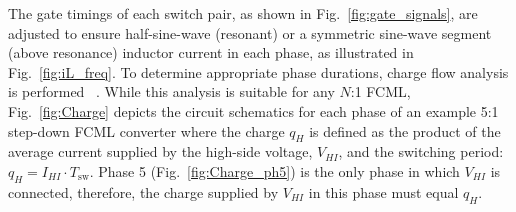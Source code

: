 








The gate timings of each switch pair, as shown in Fig.~\ref{fig:gate_signals}, are adjusted to ensure half-sine-wave (resonant) or a symmetric sine-wave segment (above resonance) inductor current in each phase, as illustrated in Fig.~\ref{fig:iL_freq}.
To determine appropriate phase durations, charge flow analysis is performed ~\cite{Seeman2008}.
While this analysis is suitable for any $N$:1 FCML, Fig.~\ref{fig:Charge} depicts the circuit schematics for each phase of an example 5:1 step-down FCML converter where the charge $q_{H}$ is defined as the product of the average current supplied by the high-side voltage, $V_{HI}$, and the switching period: $q_{H} = I_{HI}\cdot T_{\textrm{sw}}$.
Phase 5 (Fig.~\ref{fig:Charge_ph5}) is the only phase in which $V_{HI}$ is connected, therefore, the charge supplied by $V_{HI}$ in this phase must equal $q_{H}$.

